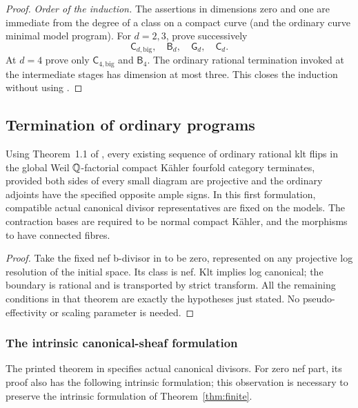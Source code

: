 \begin{proof}
\smallskip\noindent
\emph{Order of the induction.}
The assertions in dimensions zero and one are immediate from
the degree of a class on a compact curve (and the ordinary curve
minimal model program). For $d=2,3$, prove successively
\[
 \mathsf C_{d,\mathrm{big}},\quad
 \mathsf B_d,\quad \mathsf G_d,\quad\mathsf C_d.
\]
At $d=4$ prove only $\mathsf C_{4,\mathrm{big}}$ and
$\mathsf B_4$. The ordinary rational termination invoked at the
intermediate stages has dimension at most three. This closes
the induction without using \cite[Theorems~1.5 or~5.15]{HX2026}.
\end{proof}
\subsection{Termination of ordinary programs}\label{repair:sec:reduction}

\begin{corollary}\label{repair:cor:existing}
Using Theorem~1.1 of \cite{OAI:Termination-of-generalized-log-canonical-flips-on-compact-Kahler-fourfolds-October-7-2026}, every existing sequence of ordinary
rational klt flips in the global Weil $\mathbb Q$-factorial compact K\"ahler
fourfold category terminates, provided both sides of every small
diagram are projective and the ordinary adjoints have the specified
opposite ample signs. In this first formulation, compatible actual
canonical divisor representatives are fixed on the models. The contraction
bases are required to be normal compact K\"ahler, and the morphisms to
have connected fibres.
\end{corollary}
\begin{proof}
Take the fixed nef b-divisor in \cite{OAI:Termination-of-generalized-log-canonical-flips-on-compact-Kahler-fourfolds-October-7-2026} to be zero, represented on
any projective log resolution of the initial space. Its class is nef.
Klt implies log canonical;
the boundary is rational and is transported by strict transform. All
the remaining conditions in that theorem are exactly the hypotheses
just stated. No pseudo-effectivity or scaling parameter is needed.
\end{proof}

\subsubsection{The intrinsic canonical-sheaf formulation}
The printed theorem in \cite{OAI:Termination-of-generalized-log-canonical-flips-on-compact-Kahler-fourfolds-October-7-2026} specifies actual canonical divisors.
For zero nef part, its proof also has the following intrinsic
formulation; this observation is necessary to preserve the intrinsic
formulation of Theorem~\ref{thm:finite}.

